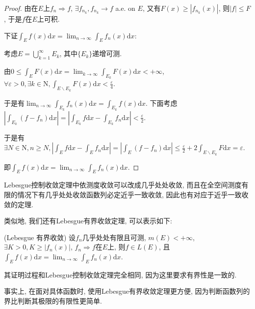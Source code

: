 \documentclass[theorem=false,mathfont=none,openany,sub3section]{easybook}
\begin{document}
\begin{proof}
  由在$E$上$f_n\Rightarrow f$, $\exists f_{n_k}, f_{n_k}\rightarrow f$ a.e. on $E$, 又有$F(x)\geqslant |f_{n_k}(x)|$, 则$|f|\leqslant F$, 于是$f$在$E$上可积.\par
  下证$\int_{E}f(x)\mathrm{d}x=\lim_{n\to \infty} \int_{E}f_n(x)\mathrm{d}x$:\par
  考虑$E=\bigcup_{k=1}^{\infty}E_k$, 其中$\{E_k\}$递增可测.\par
  由$0\leqslant \int_{E}F(x)\mathrm{d}x=\lim_{k\to \infty}\int_{E_k}F(x)\mathrm{d}x<+\infty$, $\forall \varepsilon >0, \exists k\in \mathrm{N}, \int_{E\backslash E_k}F(x)\mathrm{d}x<\frac{\varepsilon}{4}$.\par
  于是有$\lim_{n\to \infty}\int_{E_k}f_n(x)\mathrm{d}x=\int_{E_k}f(x)\mathrm{d}x$. 下面考虑$\left|\int_{E_k}(f-f_n)\mathrm{d}x\right|=\left|\int_{E_k}f\mathrm{d}x-\int_{E_k}f_n\mathrm{d}x\right|<\frac{\varepsilon}{2}$.\par
  于是有$\exists N\in \mathrm{N}, n\geqslant N, \left|\int_{E}f\mathrm{d}x-\int_{E}f_n\mathrm{d}x\right|=\left|\int_{E}(f-f_n)\mathrm{d}x\right|\leqslant \frac{\varepsilon}{2}+2\int_{E\backslash E_k}F\mathrm{d}x=\varepsilon$.\par
  即$\int_{E}f(x)\mathrm{d}x=\lim_{n\to \infty} \int_{E}f_n(x)\mathrm{d}x$.\par
\end{proof}

\begin{remark}
  Lebesgue控制收敛定理中依测度收敛可以改成几乎处处收敛, 而且在全空间测度有限的情况下有几乎处处收敛函数列必定近乎一致收敛, 因此也有对应于近乎一致收敛的定理.\par
\end{remark}

类似地, 我们还有Lebesgue有界收敛定理, 可以表示如下:\par

\begin{corollary}
  (Lebesgue 有界收敛) 设$f_n$几乎处处有限且可测, $m(E)<+\infty$, $\exists K >0, K\geqslant |f_n(x)|$, $f_n\Rightarrow f$在$E$上, 则$f\in L(E)$, 且$\int_{E}f(x)\mathrm{d}x=\lim_{n\to \infty} \int_{E}f_n(x)\mathrm{d}x$.\par
\end{corollary}

\begin{remark}
  其证明过程和Lebesgue控制收敛定理完全相同, 因为这里要求有界性是一致的.\par
  事实上, 在面对具体函数时, 使用Lebesgue有界收敛定理更方便, 因为判断函数列的界比判断其极限的有限性更简单.\par
\end{remark}
\end{document}
